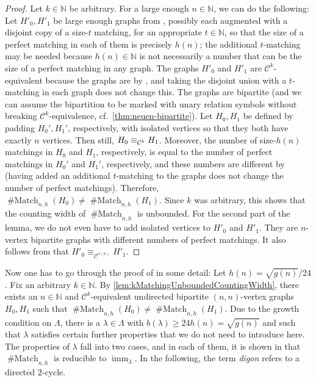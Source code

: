 \documentclass[11pt, DIV=15]{scrarticle}
\theoremstyle{definition}
\theoremstyle{plain}
\theoremstyle{remark}
\newcommand{\Cc}{{\cal C}}
\newcommand{\bbN}{\mathbb{N}}
\DeclareMathOperator{\imm}{imm}
\DeclareMathOperator{\Match}{\# Match}
\begin{document}
\begin{proof}
	Let $k \in \bbN$ be arbitrary.
	For a large enough $n \in \bbN$, we can do the following:
	Let $H'_0, H'_1$ be large enough  graphs from \cite[Theorem~7.2]{dawar_symmetric_2025}, possibly each augmented with a disjoint copy of a size-$t$ matching, for an appropriate $t \in \bbN$, so that the size of a perfect matching in each of them is precisely $h(n)$; the additional $t$-matching may be needed because $h(n) \in \bbN$ is not necessarily a number that can be the size of a perfect matching in any  graph.
	The graphs $H'_0$ and $H'_1$ are $\mathcal{C}^k$-equivalent because the  graphs are by \cite[Theorem~7.2]{dawar_symmetric_2025}, and taking the disjoint union with a $t$-matching in each graph does not change this. The graphs are bipartite (and we can assume the bipartition to be marked with unary relation symbols without breaking $\mathcal{C}^k$-equivalence, cf.\ \cref{thm:neuen-bipartite}).
	Let $H_0, H_1$ be defined by padding $H_0', H_1'$, respectively, with isolated vertices so that they both have exactly $n$ vertices. 
	Then still, $H_0 \equiv_{\Cc^k} H_1$. Moreover, the number of size-$h(n)$ matchings in $H_0$ and $H_1$, respectively, is equal to the number of perfect matchings in $H_0'$ and $H_1'$, respectively, and these numbers are different by \cite{dawar_symmetric_2025} (having added an additional $t$-matching to the graphs does not change the number of perfect matchings).
	Therefore, $\Match_{n,h}(H_0) \neq \Match_{n,h}(H_1)$. Since $k$ was arbitrary, this shows that the counting width of $\Match_{n,h}$ is unbounded.
	For the second part of the lemma, we do not even have to add isolated vertices to $H'_0$ and $H'_1$. They are $n$-vertex bipartite graphs with different numbers of perfect matchings. It also follows from \cite{dawar_symmetric_2025} that $H'_0 \equiv_{\mathcal{C}^{o(n)}} H'_1$.
\end{proof}	
Now one has to go through the proof of \cite[Theorem 2]{curticapean2021complexitydichotomyimmanantfamilies} in some detail: Let $h(n) = \sqrt{g(n)}/24$.
Fix an arbitrary $k \in \bbN$.
By \cref{lem:kMatchingUnboundedCountingWidth}, there exists an $n \in \bbN$ and $\mathcal{C}^k$-equivalent undirected bipartite $(n,n)$-vertex graphs $H_0, H_1$ such that 
$\Match_{n,h}(H_0) \neq \Match_{n,h}(H_1)$. Due to the growth condition on $\Lambda$, there is a $\lambda \in \Lambda$ with $b(\lambda) \geq 24h(n) = \sqrt{g(n)}$ and such that $\lambda$ satisfies certain further properties that we do not need to introduce here. The properties of $\lambda$ fall into two cases, and in each of them, it is shown in \cite{curticapean2021complexitydichotomyimmanantfamilies} that $\Match_{n,h}$ is reducible to $\imm_{\lambda}$. 
In the following, the term \emph{digon} refers to a directed $2$-cycle.
\end{document}
